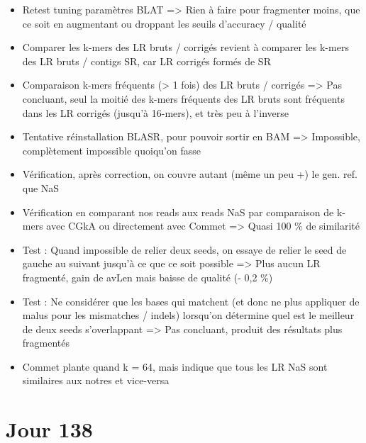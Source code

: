 \documentclass[12pt]{report}
\begin{document}
\begin{itemize}
	\item Retest tuning paramètres BLAT => Rien à faire pour fragmenter moins, que ce soit en augmentant ou droppant
		  les seuils d'accuracy / qualité
	
	\item Comparer les k-mers des LR bruts / corrigés revient à comparer les k-mers des LR bruts / contigs SR, car LR corrigés
		  formés de SR
	
	\item Comparaison k-mers fréquents (> 1 fois) des LR bruts / corrigés => Pas concluant, seul la moitié des k-mers fréquents des LR bruts
		  sont fréquents dans les LR corrigés (jusqu'à 16-mers), et très peu à l'inverse
		  
	\item Tentative réinstallation BLASR, pour pouvoir sortir en BAM => Impossible, complètement impossible quoiqu'on fasse
	
	\item Vérification, après correction, on couvre autant (même un peu +) le gen. ref. que NaS
	
	\item Vérification en comparant nos reads aux reads NaS par comparaison de k-mers avec CGkA ou directement avec Commet
		  => Quasi 100 \% de similarité
	
	\item Test : Quand impossible de relier deux seeds, on essaye de relier le seed de gauche au suivant jusqu'à ce que ce soit possible
		  => Plus aucun LR fragmenté, gain de avLen mais baisse de qualité (- 0,2 \%)
		  
	\item Test : Ne considérer que les bases qui matchent (et donc ne plus appliquer de malus pour les mismatches / indels) lorsqu'on 
		  détermine quel est le meilleur de deux seeds s'overlappant => Pas concluant, produit des résultats plus fragmentés
		  
	\item Commet plante quand k = 64, mais indique que tous les LR NaS sont similaires aux notres et vice-versa 
\end{itemize}

\section{Jour 138}
\end{document}
